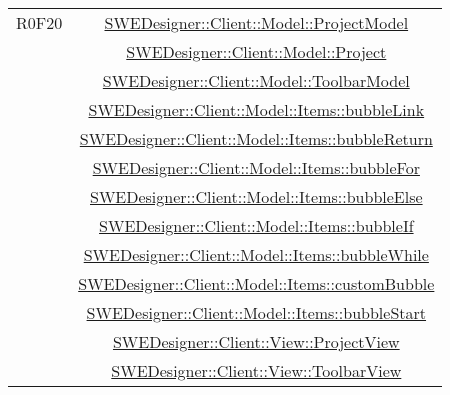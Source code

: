 \documentclass[../DefinizioneDiProdotto.tex]{subfiles}
\begin{document}
\begin{longtable}{|c|c|}
				R0F20
				& \hyperlink{SWEDesigner::Client::Model::ProjectModel}{SWEDesigner::Client::Model::ProjectModel}\\
				& \hyperlink{SWEDesigner::Client::Model::Project}{SWEDesigner::Client::Model::Project}\\
				& \hyperlink{SWEDesigner::Client::Model::ToolbarModel}{SWEDesigner::Client::Model::ToolbarModel}\\
				& \hyperlink{SWEDesigner::Client::Model::Items::bubbleLink}{SWEDesigner::Client::Model::Items::bubbleLink}\\
				& \hyperlink{SWEDesigner::Client::Model::Items::bubbleReturn}{SWEDesigner::Client::Model::Items::bubbleReturn}\\
				& \hyperlink{SWEDesigner::Client::Model::Items::bubbleFor}{SWEDesigner::Client::Model::Items::bubbleFor}\\
				& \hyperlink{SWEDesigner::Client::Model::Items::bubbleElse}{SWEDesigner::Client::Model::Items::bubbleElse}\\
				& \hyperlink{SWEDesigner::Client::Model::Items::bubbleIf}{SWEDesigner::Client::Model::Items::bubbleIf}\\
				& \hyperlink{SWEDesigner::Client::Model::Items::bubbleWhile}{SWEDesigner::Client::Model::Items::bubbleWhile}\\
				& \hyperlink{SWEDesigner::Client::Model::Items::customBubble}{SWEDesigner::Client::Model::Items::customBubble}\\
				& \hyperlink{SWEDesigner::Client::Model::Items::bubbleStart}{SWEDesigner::Client::Model::Items::bubbleStart}\\
				& \hyperlink{SWEDesigner::Client::View::ProjectView}{SWEDesigner::Client::View::ProjectView}\\
				& \hyperlink{SWEDesigner::Client::View::ToolbarView}{SWEDesigner::Client::View::ToolbarView}\\
				\hline


\end{longtable}
\end{document}
